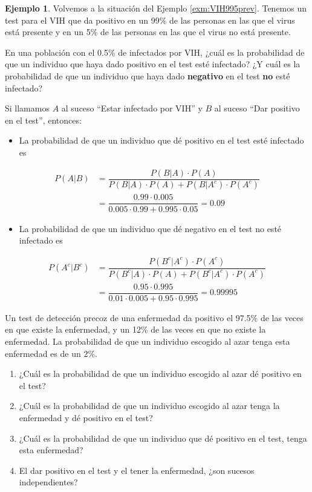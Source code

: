 \documentclass[
]{book}
\providecommand{\tightlist}{%
  \setlength{\itemsep}{0pt}\setlength{\parskip}{0pt}}
\theoremstyle{definition}
\theoremstyle{definition}
\newtheorem{example}{Ejemplo}[chapter]
\theoremstyle{definition}
\theoremstyle{definition}
\theoremstyle{remark}
\begin{document}
\begin{example}
\protect\hypertarget{exm:VIH995}{}\label{exm:VIH995}Volvemos a la situación del Ejemplo \ref{exm:VIH995prev}. Tenemos un test para el VIH que da positivo en un 99\% de las personas en las que el virus está presente y en un 5\% de las personas en las que el virus no está presente.

En una población con el 0.5\% de infectados por VIH, ¿cuál es la probabilidad de que un individuo que haya dado positivo en el test esté infectado? ¿Y cuál es la probabilidad de que un individuo que haya dado \textbf{negativo} en el test \textbf{no} esté infectado?
\end{example}

Si llamamos \(A\) al suceso ``Estar infectado por VIH'' y \(B\) al suceso ``Dar positivo en el test'', entonces:

\begin{itemize}
\tightlist
\item
  La probabilidad de que un individuo que dé positivo en el test esté infectado es
\end{itemize}

\[
\begin{array}{rl}
P(A|B)\!\!\!\! & =\dfrac{P(B|A)\cdot P(A)}{P(B|A)\cdot P(A)+P(B|A^c)\cdot P(A^c)}\\
&=\dfrac{0.99\cdot 0.005}{0.005\cdot 0.99+0.995\cdot 0.05}=0.09
\end{array}
\]

\begin{itemize}
\tightlist
\item
  La probabilidad de que un individuo que dé negativo en el test no esté infectado es
\end{itemize}

\[
\begin{array}{rl} 
P(A^c|B^c)\!\!\!\!& =\dfrac{P(B^c|A^c)\cdot P(A^c)}{P(B^c|A)\cdot P(A)+P(B^c|A^c)\cdot P(A^c)}\\
& =\dfrac{0.95\cdot 0.995}{0.01\cdot 0.005+0.95\cdot 0.995}=0.99995
\end{array}
\]

\begin{rmdexercici}
Un test de detección precoz de una enfermedad da positivo el 97.5\% de las veces en que existe la enfermedad, y un 12\% de las veces en que no existe la enfermedad. La probabilidad de que un individuo escogido al azar tenga esta enfermedad es de un 2\%.

\begin{enumerate}
\def\labelenumi{\alph{enumi}.}
\item
  ¿Cuál es la probabilidad de que un individuo escogido al azar dé positivo en el test?
\item
  ¿Cuál es la probabilidad de que un individuo escogido al azar tenga la enfermedad y dé positivo en el test?
\item
  ¿Cuál es la probabilidad de que un individuo que dé positivo en el test, tenga esta enfermedad?
\item
  El dar positivo en el test y el tener la enfermedad, ¿son sucesos independientes?
\end{enumerate}
\end{rmdexercici}
\end{document}
